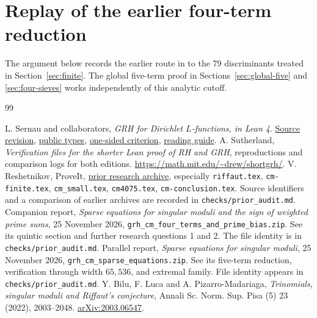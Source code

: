\section{Replay of the earlier four-term reduction}\label{sec:earlier}
The argument below records the earlier route in \cite{prior} to the 79 discriminants treated in Section~\ref{sec:finite}. The global five-term proof in Sections~\ref{sec:global-five} and \ref{sec:four-sieves} works independently of this analytic cutoff.

\begin{thebibliography}{99}\small\raggedright
{} L. Sernau and collaborators, \emph{GRH for Dirichlet $L$-functions, in Lean 4}. \href{https://github.com/lsernau/grh-lean/tree/72fead102f663d5c7a407964a13dc0cf9d977207}{Source revision}, \href{https://github.com/lsernau/grh-lean/blob/72fead102f663d5c7a407964a13dc0cf9d977207/grh/src/Statements.lean}{public types}, \href{https://github.com/lsernau/grh-lean/blob/72fead102f663d5c7a407964a13dc0cf9d977207/grh/src/New/Reduction/Zeros/Criterion.lean}{one-sided criterion}, \href{https://github.com/lsernau/grh-lean/blob/72fead102f663d5c7a407964a13dc0cf9d977207/grh/GUIDE.md}{reading guide}.
 A. Sutherland, \emph{Verification files for the shorter Lean proof of RH and GRH}, reproductions and comparison logs for both editions. \url{https://math.mit.edu/~drew/shortgrh/}.
 V. Reshetnikov, ProveIt, \href{https://github.com/VladimirReshetnikov/ProveIt/blob/c477d08ef7be4241e94bd1cffb43ff56240321e3/docs/incoming/grh_cm_prime_applications.zip}{prior research archive}, especially \texttt{riffaut.tex}, \texttt{cm-finite.tex}, \texttt{cm\_small.tex}, \texttt{cm4075.tex}, \texttt{cm-conclusion.tex}. Source identifiers and a comparison of earlier archives are recorded in \texttt{checks/prior\_audit.md}.
 Companion report, \emph{Sparse equations for singular moduli and the sign of weighted prime sums}, 25 November 2026, \texttt{grh\_cm\_four\_terms\_and\_prime\_bias.zip}. See its quintic section and further research questions 1 and 2. The file identity is in \texttt{checks/prior\_audit.md}.
 Parallel report, \emph{Sparse equations for singular moduli}, 25 November 2026, \texttt{grh\_cm\_sparse\_equations.zip}. See its five-term reduction, verification through width $65{,}536$, and extremal family. File identity appears in \texttt{checks/prior\_audit.md}.
 Y. Bilu, F. Luca and A. Pizarro-Madariaga, \emph{Trinomials, singular moduli and Riffaut's conjecture}, Annali Sc. Norm. Sup. Pisa (5) 23 (2022), 2003--2048. \href{https://arxiv.org/abs/2003.06547}{arXiv:2003.06547}.

\end{thebibliography}
